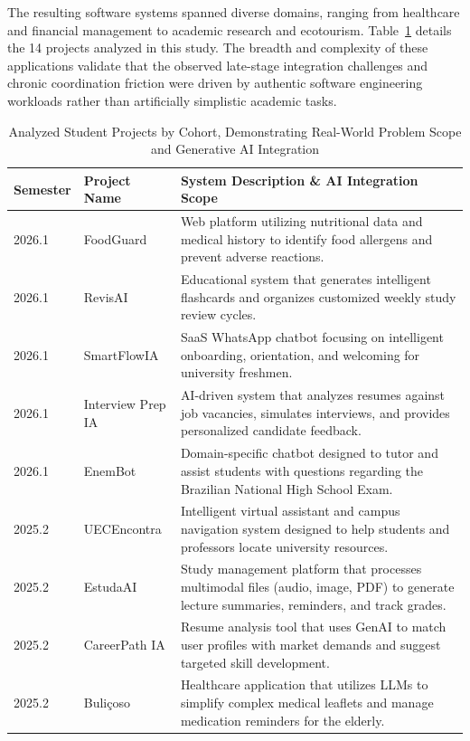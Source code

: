 \documentclass[conference]{IEEEtran}
\begin{document}
The resulting software systems spanned diverse domains, ranging from healthcare and financial management to academic research and ecotourism. Table~\ref{tab:projects} details the 14 projects analyzed in this study. The breadth and complexity of these applications validate that the observed late-stage integration challenges and chronic coordination friction were driven by authentic software engineering workloads rather than artificially simplistic academic tasks. 

\begin{table}[t]
\caption{Analyzed Student Projects by Cohort, Demonstrating Real-World Problem Scope and Generative AI Integration}
\label{tab:projects}
\centering
\begin{tabular}{@{}lp{3cm}p{12.5cm}@{}}
\toprule
\textbf{Semester} & \textbf{Project Name} & \textbf{System Description \& AI Integration Scope} \\
\midrule
2026.1 & FoodGuard & Web platform utilizing nutritional data and medical history to identify food allergens and prevent adverse reactions. \\
2026.1 & RevisAI & Educational system that generates intelligent flashcards and organizes customized weekly study review cycles. \\
2026.1 & SmartFlowIA & SaaS WhatsApp chatbot focusing on intelligent onboarding, orientation, and welcoming for university freshmen. \\
2026.1 & Interview Prep IA & AI-driven system that analyzes resumes against job vacancies, simulates interviews, and provides personalized candidate feedback. \\
2026.1 & EnemBot & Domain-specific chatbot designed to tutor and assist students with questions regarding the Brazilian National High School Exam. \\
\midrule
2025.2 & UECEncontra & Intelligent virtual assistant and campus navigation system designed to help students and professors locate university resources. \\
2025.2 & EstudaAI & Study management platform that processes multimodal files (audio, image, PDF) to generate lecture summaries, reminders, and track grades. \\
2025.2 & CareerPath IA & Resume analysis tool that uses GenAI to match user profiles with market demands and suggest targeted skill development. \\
2025.2 & Buliçoso & Healthcare application that utilizes LLMs to simplify complex medical leaflets and manage medication reminders for the elderly. \\

\end{tabular}
\end{table}
\end{document}
